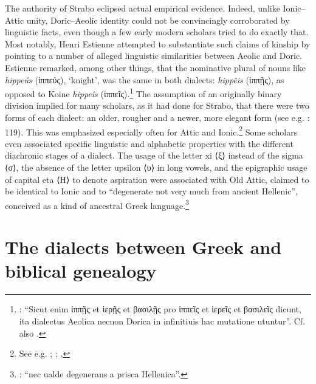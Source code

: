 The authority of Strabo eclipsed actual empirical evidence. Indeed, unlike Ionic–Attic unity, Doric–Aeolic identity could not be convincingly corroborated by linguistic facts, even though a few early modern scholars tried to do exactly that. Most notably, Henri Estienne attempted to substantiate such claims of kinship by pointing to a number of alleged linguistic similarities between Aeolic and Doric. Estienne remarked, among other things, that the nominative plural of nouns like \textit{hippeús} (ἱππεύς), ‘knight’, was the same in both dialects: \textit{hippêis} (ἱππῇς), as opposed to Koine \textit{hippeîs} (ἱππεῖς).\footnote{\citet[25--26]{Estienne1581}: “Sicut enim ἱππῇς et ἱερῇς et βασιλῇς pro ἱππεῖς et ἱερεῖς et βασιλεῖς dicunt, ita dialectus Aeolica necnon Dorica in infinitiuis hac mutatione utuntur”. Cf. also \citet[179]{Trendelenburg1782}.} The assumption of an originally binary division implied for many scholars, as it had done for Strabo, that there were two forms of each dialect: an older, rougher and a newer, more elegant form (see e.g. \citealt{Mazzocchi1754}: 119). This was emphasized especially often for Attic and Ionic.\footnote{See e.g. \citet[18]{Hauptmann1737}; \citet[137]{Walch1772}; \citet[\textsc{iv–v}]{Facius1782}.} Some scholars even associated specific linguistic and alphabetic properties with the different diachronic stages of a dialect. The usage of the letter xi ⟨ξ⟩ instead of the sigma ⟨σ⟩, the absence of the letter upsilon ⟨υ⟩ in long vowels, and the epigraphic usage of capital eta ⟨H⟩ to denote aspiration were associated with Old Attic, claimed to be identical to Ionic and to “degenerate not very much from ancient Hellenic”, conceived as a kind of ancestral Greek language.\footnote{\citet[4--5]{Munthe1748}: “nec ualde degenerans a prisca Hellenica”.}

\section{The dialects between Greek and biblical genealogy}\label{sec:5.3}


